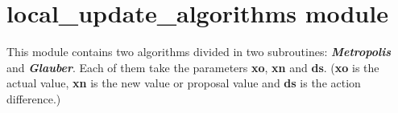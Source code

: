 \section{local\_update\_algorithms module}

This module contains two algorithms divided in two subroutines: \textit{\textbf{Metropolis}} and \textit{\textbf{Glauber}}. Each of them take the parameters \textbf{xo}, \textbf{xn} and \textbf{ds}. (\textbf{xo} is the actual value, \textbf{xn} is the new value or proposal value and \textbf{ds} is the action difference.)